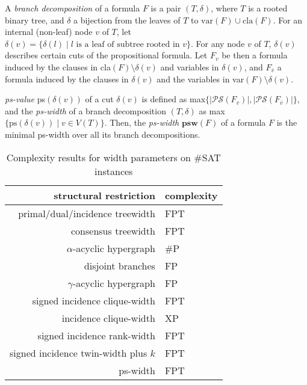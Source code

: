 \documentclass{article}
\begin{document}
A {\em branch decomposition} of a formula $F$ is a pair $(T, \delta)$, where $T$ is a rooted binary tree, and $\delta$ a bijection from the leaves of $T$ to $\text{var}(F) \cup \text{cla}(F)$.
For an internal (non-leaf) node $v$ of $T$, let $\delta(v) = \{ \delta(l) \; | \; l \text{ is a leaf of subtree rooted in } v \}$.
For any node $v$ of $T$, $\delta(v)$ describes certain cuts of the propositional formula.
Let $F_v$ be then a formula induced by the clauses in cla$(F)\setminus \delta(v)$ and variables in $\delta(v)$, and $F_{\overline{v}}$ a formula induced by the clauses in $\delta(v)$ and the variables in var$(F)\setminus \delta(v)$.

{\em ps-value} ps$(\delta(v))$ of a cut $\delta(v)$ is defined as max$\{|\mathcal{PS}(F_v)|, |\mathcal{PS}(F_{\overline{v}})|\}$, and the {\em ps-width} of a branch decomposition $(T,\delta)$ as max$\{ \text{ps}(\delta(v)) \; | \; v \in V(T) \}$. 
Then, the {\em ps-width} $\mathbf{psw}(F)$ of a formula $F$ is the minimal ps-width over all its branch decompositions.\\

\begin{table}
	\centering
	\begin{tabular}{r | l}
		\textbf{structural restriction} & \textbf{complexity} \\
		\hline
		primal/dual/incidence treewidth & FPT \cite{DBLP:journals/jda/SamerS10} \\
		consensus treewidth & FPT \cite{DBLP:conf/sat/GanianS17} \\
		\hline
		$\alpha$-acyclic hypergraph & \#P \cite{DBLP:conf/sat/CapelliDM14} \\
		disjoint branches & FP \cite{DBLP:conf/sat/CapelliDM14} \\
		$\gamma$-acyclic hypergraph & FP \cite{DBLP:conf/sat/CapelliDM14} \\
		\hline
		signed incidence clique-width & FPT \cite{DBLP:journals/dam/FischerMR08} \\
		incidence clique-width & XP \cite{DBLP:conf/isaac/SlivovskyS13} \\
		\hline
		signed incidence rank-width & FPT \cite{DBLP:journals/fuin/GanianHO13} \\
		signed incidence twin-width plus $k$ & FPT \cite{DBLP:conf/sat/GanianPSSS22} \\
		ps-width & FPT \cite{DBLP:conf/sat/SaetherTV14}
	\end{tabular}
	\caption{Complexity results for width parameters on \#SAT instances}
	\label{table:complexity}
\end{table}
\end{document}
